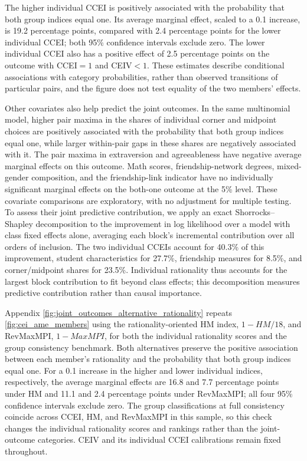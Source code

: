 \documentclass[11 pt]{article}
\begin{document}
The higher individual CCEI is positively associated with the probability that both group indices equal one. Its average marginal effect, scaled to a 0.1 increase, is 19.2 percentage points, compared with 2.4 percentage points for the lower individual CCEI; both 95\% confidence intervals exclude zero. The lower individual CCEI also has a positive effect of 2.5 percentage points on the outcome with CCEI$=1$ and CEIV$<1$. These estimates describe conditional associations with category probabilities, rather than observed transitions of particular pairs, and the figure does not test equality of the two members' effects.


Other covariates also help predict the joint outcomes. In the same multinomial model, higher pair maxima in the shares of individual corner and midpoint choices are positively associated with the probability that both group indices equal one, while larger within-pair gaps in these shares are negatively associated with it. The pair maxima in extraversion and agreeableness have negative average marginal effects on this outcome. Math scores, friendship-network degrees, mixed-gender composition, and the friendship-link indicator have no individually significant marginal effects on the both-one outcome at the 5\% level. These covariate comparisons are exploratory, with no adjustment for multiple testing. To assess their joint predictive contribution, we apply an exact Shorrocks--Shapley decomposition to the improvement in log likelihood over a model with class fixed effects alone, averaging each block's incremental contribution over all orders of inclusion. The two individual CCEIs account for 40.3\% of this improvement, student characteristics for 27.7\%, friendship measures for 8.5\%, and corner/midpoint shares for 23.5\%. Individual rationality thus accounts for the largest block contribution to fit beyond class effects; this decomposition measures predictive contribution rather than causal importance.

Appendix \autoref{fig:joint_outcomes_alternative_rationality} repeats \autoref{fig:cei_ame_members} using the rationality-oriented HM index, $1-HM/18$, and RevMaxMPI, $1-MaxMPI$, for both the individual rationality scores and the group consistency benchmark. Both alternatives preserve the positive association between each member's rationality and the probability that both group indices equal one. For a 0.1 increase in the higher and lower individual indices, respectively, the average marginal effects are 16.8 and 7.7 percentage points under HM and 11.1 and 2.4 percentage points under RevMaxMPI; all four 95\% confidence intervals exclude zero. The group classifications at full consistency coincide across CCEI, HM, and RevMaxMPI in this sample, so this check changes the individual rationality scores and rankings rather than the joint-outcome categories. CEIV and its individual CCEI calibrations remain fixed throughout.
\end{document}
